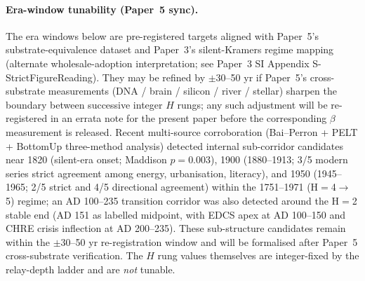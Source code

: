 \paragraph{Era-window tunability (Paper~5 sync).} The era windows below are pre-registered targets aligned with Paper~5's substrate-equivalence dataset and Paper~3's silent-Kramers regime mapping (alternate wholesale-adoption interpretation; see Paper~3 SI Appendix S-StrictFigureReading). They may be refined by $\pm$30--50 yr if Paper~5's cross-substrate measurements (DNA / brain / silicon / river / stellar) sharpen the boundary between successive integer $H$ rungs; any such adjustment will be re-registered in an errata note for the present paper before the corresponding $\beta$ measurement is released. Recent multi-source corroboration (Bai--Perron + PELT + BottomUp three-method analysis) detected internal sub-corridor candidates near 1820 (silent-era onset; Maddison $p=0.003$), 1900 (1880--1913; 3/5 modern series strict agreement among energy, urbanisation, literacy), and 1950 (1945--1965; 2/5 strict and 4/5 directional agreement) within the 1751--1971 (H${=}$4$\to$5) regime; an AD 100--235 transition corridor was also detected around the H${=}$2 stable end (AD 151 as labelled midpoint, with EDCS apex at AD 100--150 and CHRE crisis inflection at AD 200--235). These sub-structure candidates remain within the $\pm$30--50 yr re-registration window and will be formalised after Paper~5 cross-substrate verification. The $H$ rung values themselves are integer-fixed by the relay-depth ladder and are \emph{not} tunable.

